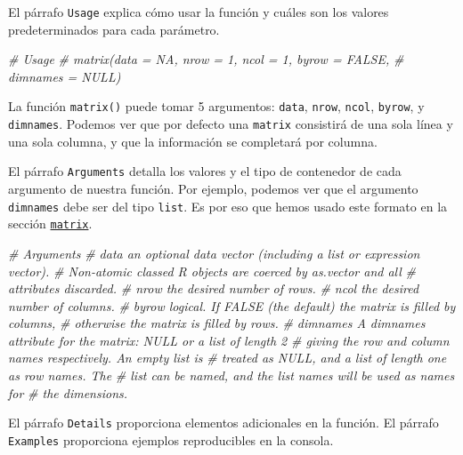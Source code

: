 \documentclass[
]{book}
\newenvironment{Shaded}{\begin{snugshade}}{\end{snugshade}}
\newcommand{\CommentTok}[1]{\textcolor[rgb]{0.56,0.35,0.01}{\textit{#1}}}
\begin{document}
El párrafo \texttt{Usage} explica cómo usar la función y cuáles son los valores predeterminados para cada parámetro.

\begin{Shaded}
\begin{Highlighting}[]
\CommentTok{# Usage}
\CommentTok{# matrix(data = NA, nrow = 1, ncol = 1, byrow = FALSE,}
\CommentTok{#        dimnames = NULL)}
\end{Highlighting}
\end{Shaded}

La función \texttt{matrix()} puede tomar 5 argumentos: \texttt{data}, \texttt{nrow}, \texttt{ncol}, \texttt{byrow}, y \texttt{dimnames}. Podemos ver que por defecto una \texttt{matrix} consistirá de una sola línea y una sola columna, y que la información se completará por columna.

El párrafo \texttt{Arguments} detalla los valores y el tipo de contenedor de cada argumento de nuestra función. Por ejemplo, podemos ver que el argumento \texttt{dimnames} debe ser del tipo \texttt{list}. Es por eso que hemos usado este formato en la sección \protect\hyperlink{l014matrix}{\texttt{matrix}}.

\begin{Shaded}
\begin{Highlighting}[]
\CommentTok{# Arguments}
\CommentTok{# data      an optional data vector (including a list or expression vector). }
\CommentTok{#           Non-atomic classed R objects are coerced by as.vector and all }
\CommentTok{#           attributes discarded.}
\CommentTok{# nrow      the desired number of rows.}
\CommentTok{# ncol      the desired number of columns.}
\CommentTok{# byrow     logical. If FALSE (the default) the matrix is filled by columns, }
\CommentTok{#           otherwise the matrix is filled by rows.}
\CommentTok{# dimnames  A dimnames attribute for the matrix: NULL or a list of length 2 }
\CommentTok{#           giving the row and column names respectively. An empty list is }
\CommentTok{#           treated as NULL, and a list of length one as row names. The }
\CommentTok{#           list can be named, and the list names will be used as names for }
\CommentTok{#           the dimensions.}
\end{Highlighting}
\end{Shaded}

El párrafo \texttt{Details} proporciona elementos adicionales en la función. El párrafo \texttt{Examples} proporciona ejemplos reproducibles en la consola.
\end{document}
